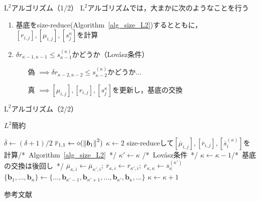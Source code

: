 \documentclass[12pt,aspectratio=169,xcolor=dvipsnames,table,dvipdfmx, leqno]{beamer}
\renewcommand{\Comment}[1]{\quad/*~#1~*/}
\begin{document}
\begin{frame}{$\text{L}^2$アルゴリズム（1/2）}
$\text{L}^2$アルゴリズムでは，大まかに次のようなことを行う
\begin{enumerate}
    \item 基底をsize-reduce(Algorithm~\ref{alg_size_L2})するとともに，$[r_{i, j}], [\mu_{i, j}], [s_j^{\kappa}]$を計算
    \item $\delta r_{\kappa-1, \kappa-1}\le s_{\kappa-1}^{(\kappa)}$かどうか（Lov\'asz条件）
    \begin{itemize}
        \item[偽] $\implies$$\delta r_{\kappa-2, \kappa-2}\le s_{\kappa-2}^{(\kappa)}$かどうか$\ldots$
        \item[真] $\implies$$[\mu_{i, j}], [r_{i, j}], [s_j^{\kappa}]$を更新し，基底の交換 
    \end{itemize}
\end{enumerate}
\end{frame}

\begin{frame}{$\text{L}^2$アルゴリズム（2/2）}
\begin{algorithm}[H]
    \footnotesize
    \begin{algorithmic}[1]
        \caption{\footnotesize $L^2$簡約}
        \label{alg_L2}
        \State $\overline{\delta}\gets(\delta+1)/2$
        \State $\overline{r}_{1,1}\gets\diamond(\norm{\bm{b}_1}^2)$
        \State $\kappa\gets 2$
            \State size-reduceして$[\overline{\mu}_{i, j}], [\overline{r}_{i, j}], [\overline{s}_{i}^{(\kappa)}]$を計算\Comment{Algorithm~\ref{alg_size_L2}}
            \State $\kappa'\gets\kappa$
            \Comment{Lov\'asz条件}
                \State $\kappa\gets\kappa-1$\Comment{基底の交換は後回し}
            \EndWhile
                \State $\overline{\mu}_{\kappa, i}\gets\overline{\mu}_{\kappa', i};~\overline{r}_{\kappa, i}\gets\overline{r}_{\kappa', i};~\overline{r}_{\kappa, \kappa}\gets\overline{s}_{\kappa}^{(\kappa')}$
            \EndFor
            \State $\{\bm{b}_1,\ldots,\bm{b}_n\}\gets\{\ldots, \bm{b}_{\kappa'-1}, \bm{b}_{\kappa'+1},\ldots,\bm{b}_{\kappa'}, \bm{b}_\kappa, \ldots\}$
            \State $\kappa\gets \kappa+1$
        \EndWhile
    \end{algorithmic}
\end{algorithm}
\end{frame}

\begin{frame}[allowframebreaks]{参考文献}
\beamertemplatetextbibitems


\end{frame}
\end{document}
